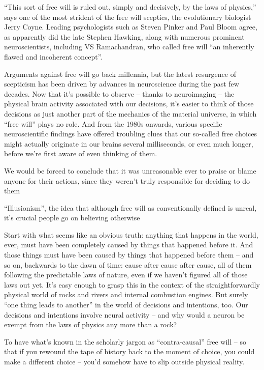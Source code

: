 \documentclass[
]{book}
\begin{document}
``This sort of free will is ruled out, simply and decisively, by the laws of physics,'' says one of the most strident of the free will sceptics, the evolutionary biologist Jerry Coyne.
Leading psychologists such as Steven Pinker and Paul Bloom agree, as apparently did the late Stephen Hawking, along with numerous prominent neuroscientists, including VS Ramachandran, who called free will ``an inherently flawed and incoherent concept''.

Arguments against free will go back millennia, but the latest resurgence of scepticism has been driven by advances in neuroscience during the past few decades. Now that it's possible to observe -- thanks to neuroimaging -- the physical brain activity associated with our decisions, it's easier to think of those decisions as just another part of the mechanics of the material universe, in which ``free will'' plays no role. And from the 1980s onwards, various specific neuroscientific findings have offered troubling clues that our so-called free choices might actually originate in our brains several milliseconds, or even much longer, before we're first aware of even thinking of them.

We would be forced to conclude that it was unreasonable ever to praise or blame anyone for their actions, since they weren't truly responsible for deciding to do them

``Illusionism'', the idea that although free will as conventionally defined is unreal, it's crucial people go on believing otherwise

Start with what seems like an obvious truth: anything that happens in the world, ever, must have been completely caused by things that happened before it. And those things must have been caused by things that happened before them -- and so on, backwards to the dawn of time: cause after cause after cause, all of them following the predictable laws of nature, even if we haven't figured all of those laws out yet. It's easy enough to grasp this in the context of the straightforwardly physical world of rocks and rivers and internal combustion engines. But surely ``one thing leads to another'' in the world of decisions and intentions, too. Our decisions and intentions involve neural activity -- and why would a neuron be exempt from the laws of physics any more than a rock?

To have what's known in the scholarly jargon as ``contra-causal'' free will -- so that if you rewound the tape of history back to the moment of choice, you could make a different choice -- you'd somehow have to slip outside physical reality.
\end{document}
